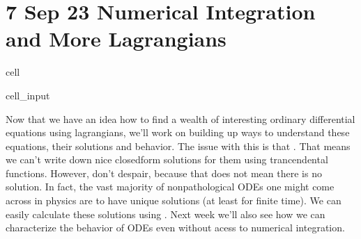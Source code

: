 \documentclass[letterpaper,10pt,english]{jupyterBook}
\begin{document}
\chapter{7 Sep 23 \sphinxhyphen{} Numerical Integration and More Lagrangians}
\label{\detokenize{content/1_mechanics/lagrange_2:sep-23-numerical-integration-and-more-lagrangians}}\label{\detokenize{content/1_mechanics/lagrange_2::doc}}
\begin{sphinxuseclass}{cell}\begin{sphinxVerbatimInput}

\begin{sphinxuseclass}{cell_input}
\begin{sphinxVerbatim}[commandchars=\\\{\}]
   
   
   
   
\end{sphinxVerbatim}

\end{sphinxuseclass}\end{sphinxVerbatimInput}

\end{sphinxuseclass}
\sphinxAtStartPar
Now that we have an idea how to find a wealth of interesting ordinary differential equations using lagrangians, we’ll work on building up ways to understand these equations, their solutions and behavior. The issue with this is that . That means we can’t write down nice closed\sphinxhyphen{}form solutions for them using trancendental functions. However, don’t despair, because that does not mean there is no solution. In fact, the vast majority of non\sphinxhyphen{}pathological ODEs one might come across in physics are  to have unique solutions (at least for finite time). We can easily calculate these solutions using . Next week we’ll also see how we can characterize the behavior of ODEs even without acess to numerical integration.
\end{document}
